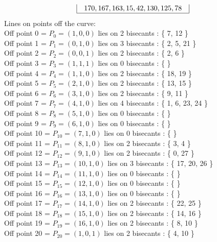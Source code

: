 \documentclass{article}
\begin{document}
{$$\begin{array}{|r|r|l|}
\begin{array}{l}
170, 167, 163, 15, 42, 130, 125, 78\end{array}
\\
\hline
\end{array}
$$
Lines on points off the curve:\\
Off point 0 = $P_{0} = ( 1, 0, 0 )$ lies on 2 bisecants : \{ 7, 12 \}\\
Off point 1 = $P_{1} = ( 0, 1, 0 )$ lies on 3 bisecants : \{ 2, 5, 21 \}\\
Off point 2 = $P_{2} = ( 0, 0, 1 )$ lies on 2 bisecants : \{ 2, 6 \}\\
Off point 3 = $P_{3} = ( 1, 1, 1 )$ lies on 0 bisecants : \{  \}\\
Off point 4 = $P_{4} = ( 1, 1, 0 )$ lies on 2 bisecants : \{ 18, 19 \}\\
Off point 5 = $P_{5} = ( 2, 1, 0 )$ lies on 2 bisecants : \{ 13, 15 \}\\
Off point 6 = $P_{6} = ( 3, 1, 0 )$ lies on 2 bisecants : \{ 9, 11 \}\\
Off point 7 = $P_{7} = ( 4, 1, 0 )$ lies on 4 bisecants : \{ 1, 6, 23, 24 \}\\
Off point 8 = $P_{8} = ( 5, 1, 0 )$ lies on 0 bisecants : \{  \}\\
Off point 9 = $P_{9} = ( 6, 1, 0 )$ lies on 0 bisecants : \{  \}\\
Off point 10 = $P_{10} = ( 7, 1, 0 )$ lies on 0 bisecants : \{  \}\\
Off point 11 = $P_{11} = ( 8, 1, 0 )$ lies on 2 bisecants : \{ 3, 4 \}\\
Off point 12 = $P_{12} = ( 9, 1, 0 )$ lies on 2 bisecants : \{ 0, 27 \}\\
Off point 13 = $P_{13} = ( 10, 1, 0 )$ lies on 3 bisecants : \{ 17, 20, 26 \}\\
Off point 14 = $P_{14} = ( 11, 1, 0 )$ lies on 0 bisecants : \{  \}\\
Off point 15 = $P_{15} = ( 12, 1, 0 )$ lies on 0 bisecants : \{  \}\\
Off point 16 = $P_{16} = ( 13, 1, 0 )$ lies on 0 bisecants : \{  \}\\
Off point 17 = $P_{17} = ( 14, 1, 0 )$ lies on 2 bisecants : \{ 22, 25 \}\\
Off point 18 = $P_{18} = ( 15, 1, 0 )$ lies on 2 bisecants : \{ 14, 16 \}\\
Off point 19 = $P_{19} = ( 16, 1, 0 )$ lies on 2 bisecants : \{ 8, 10 \}\\
Off point 20 = $P_{20} = ( 1, 0, 1 )$ lies on 2 bisecants : \{ 4, 10 \}\\
}
\end{document}
